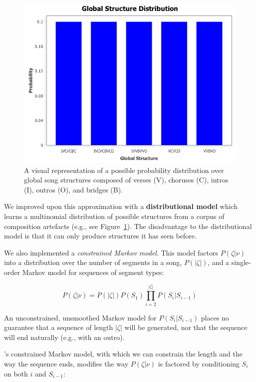 \documentclass[letterpaper]{article}
\begin{document}
\begin{figure}
	\centering
	\includegraphics[width=\linewidth]{global_structure}
	\caption{\label{fig:global_structure} A visual representation of a possible probability distribution over global song structures composed of verses (V), choruses (C), intros (I), outros (O), and bridges (B).}
\end{figure}

We improved upon this approximation with a \textbf{distributional model} which learns a multinomial distribution of possible structures from a corpus of composition artefacts (e.g., see Figure~\ref{fig:global_structure}). The disadvantage to the distributional model is that it can only produce structures it has seen before. 

We also implemented a \emph{constrained Markov model}. This model factors $P(\zeta|\nu)$ into a distribution over the number of segments in a song, $P(|\zeta|)$, and a single-order Markov model for sequences of segment types:

\[ P(\zeta|\nu) = P(|\zeta|) P(S_1) \prod_{i=2}^{|\zeta|} P(S_i|S_{i-1}) \]

\noindent An unconstrained, unsmoothed Markov model for $P(S_i|S_{i-1})$ places no guarantee that a sequence of length $|\zeta|$ will be generated, nor that the sequence will end naturally (e.g., with an outro). 

\citeauthor{pachet2001finite}'s constrained Markov model, with which we can constrain the length and the way the sequence ends, modifies the way $P(\zeta|\nu)$ is factored by conditioning $S_i$ on both $i$ and $S_{i-1}$:
\end{document}
